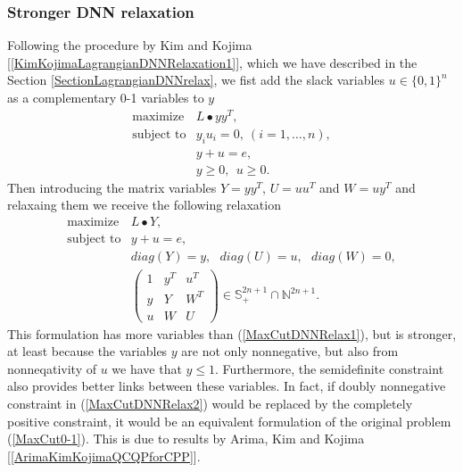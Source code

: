 \documentclass[12pt]{book}
\theoremstyle{definition}
\begin{document}
\subsubsection{Stronger DNN relaxation}
Following the procedure by Kim and Kojima [\ref{KimKojimaLagrangianDNNRelaxation1}], which we have described in the Section \ref{SectionLagrangianDNNrelax}, we fist add the slack variables $u\in\{0,1\}^n$ as a complementary 0-1 variables to $y$
\begin{equation}
\label{MaxCut complementarity formulation}
\begin{array}{ll}
\mbox{maximize} &  L\bullet yy^T, \\
\mbox{subject to} & y_iu_i = 0, \ (i = 1,\dots ,n), \\
				& y + u = e, \\
				& y\geq 0, \ \ u\geq 0.
\end{array}	
\end{equation}
Then introducing the matrix variables $Y = yy^T$,  $U = uu^T$ and $W = uy^T$  and relaxaing them we receive the following relaxation
\begin{equation}
\label{MaxCutDNNRelax2}
\begin{array}{ll}
\mbox{maximize} &  L\bullet Y, \\
\mbox{subject to} & y + u = e, \\
				& diag(Y) = y, \ \ \ diag(U) = u, \ \ \ diag(W) = 0, \\
				& \left(\begin{array}{lll}
				1 & y^T & u^T \\ 
				y & Y 	& W^T \\
				u & W 	& U
				\end{array}\right) \in\mathbb{S}^{2n+1}_+ \cap \mathbb{N}^{2n+1}.
\end{array}	
\end{equation}
This formulation has more variables than (\ref{MaxCutDNNRelax1}), but is stronger, at least because the variables $y$ are not only nonnegative, but also from nonneqativity of $u$ we have that $y\leq 1$. Furthermore, the semidefinite constraint also provides better links between these variables. In fact, if doubly nonnegative constraint in (\ref{MaxCutDNNRelax2}) would be replaced by the completely positive constraint, it would be an equivalent formulation of the original problem (\ref{MaxCut0-1}). This is due to results by Arima, Kim and Kojima [\ref{ArimaKimKojimaQCQPforCPP}].
\end{document}
